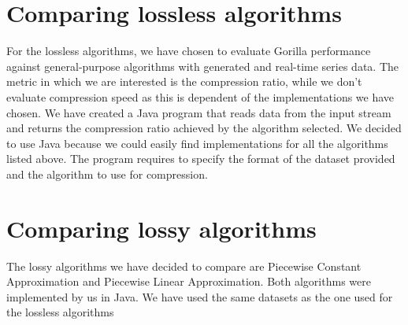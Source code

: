 \section{Comparing lossless algorithms}
For the lossless algorithms, we have chosen to evaluate Gorilla performance against general-purpose
algorithms with generated and real-time series data. The metric in which we are interested is the
compression ratio, while we don't evaluate compression speed as this is dependent of the implementations we have
chosen. We have created a Java program that reads data from the input stream and returns the compression ratio
achieved by the algorithm selected. We decided to use Java because we could easily find implementations for
all the algorithms listed above. The program requires to specify the format of the dataset provided and the
algorithm to use for compression.

\section{Comparing lossy algorithms}
The lossy algorithms we have decided to compare are Piecewise Constant Approximation and Piecewise Linear
Approximation. Both algorithms were implemented by us in Java. We have used the same datasets as the one used
for the lossless algorithms


